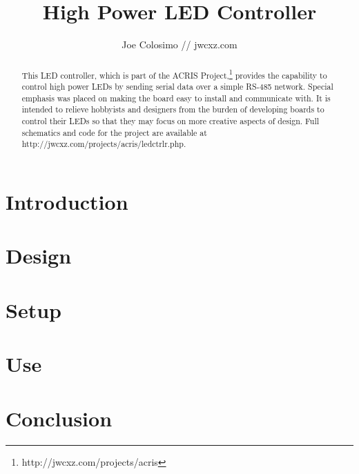 \documentclass[letterpaper,11pt,twocolumn]{report}
\begin{document}
    \title{High Power LED Controller}
    \author{Joe Colosimo // jwcxz.com}
    \maketitle

    \begin{abstract}\centering
        This LED controller, which is part of the ACRIS
        Project,\footnote{http://jwcxz.com/projects/acris} provides the
        capability to control high power LEDs by sending serial data over a
        simple RS-485 network.  Special emphasis was placed on making the board
        easy to install and communicate with.  It is intended to relieve
        hobbyists and designers from the burden of developing boards to control
        their LEDs so that they may focus on more creative aspects of design.
        Full schematics and code for the project are available at
            http://jwcxz.com/projects/acris/ledctrlr.php.
    \end{abstract}
    \clearpage

    \tableofcontents

\section{Introduction}
    \label{sec:intro}
    

\section{Design}
    \label{sec:design}
    

\section{Setup}
    \label{sec:setup}
    

\section{Use}
    \label{sec:use}
    

\section{Conclusion}
    \label{sec:conclusion}
    
\end{document}
